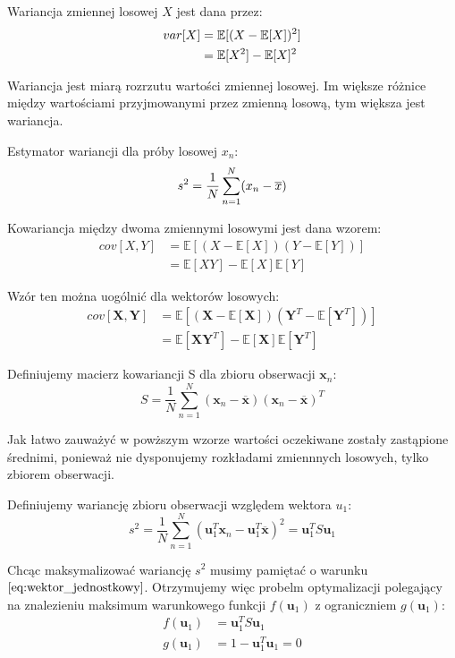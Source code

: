 \documentclass[oneside, eng]{mgr}
\newcommand{\bb}{\textbf}
\begin{document}
Wariancja zmiennej losowej $X$ jest dana przez:
\begin{align*}	\notag
	var[X]  &= \mathbb{E}[(X - \mathbb{E}[X])^2] \\
			&= \mathbb{E}[X^2] - \mathbb{E}[X]^2
\end{align*}

Wariancja jest miarą rozrzutu wartości zmiennej losowej. Im większe różnice między wartościami przyjmowanymi przez zmienną losową, tym większa jest wariancja.

Estymator wariancji dla próby losowej $x_n$:
\begin{equation}	\notag
	s^2 = \frac{1}{N} \sum_{n=1}^{N}(x_n - \overline{x})
\end{equation}

Kowariancja między dwoma zmiennymi losowymi jest dana wzorem:
\begin{align}	
	cov[X,Y] &= \mathbb{E}[(X - \mathbb{E}[X])(Y - \mathbb{E}[Y])]  \label{eq:cov} \\ 
			 &= \mathbb{E}[XY] - \mathbb{E}[X]\mathbb{E}[Y] \nonumber
\end{align}

Wzór ten można uogólnić dla wektorów losowych:
\begin{align*}
	cov[\textbf{X}, \bb{Y}] &= \mathbb{E}[(\bb{X} - \mathbb{E}[\bb{X}])(\bb{Y}^T - \mathbb{E}[\bb{Y}^T])] \\
							&= \mathbb{E}[\bb{X}\bb{Y}^T] - \mathbb{E}[\bb{X}]\mathbb{E}[\bb{Y}^T]
\end{align*}

Definiujemy macierz kowariancji S dla zbioru obserwacji $\bb{x}_n$:
\begin{equation}
	S = \frac{1}{N} \sum_{n=1}^{N} (\bb{x}_n - \overline{\bb{x}})(\bb{x}_n - \overline{\bb{x}})^T
\end{equation}

Jak łatwo zauważyć w powższym wzorze wartości oczekiwane zostały zastąpione średnimi, ponieważ nie dysponujemy rozkładami zmiennnych losowych, tylko zbiorem obserwacji.

Definiujemy wariancję zbioru obserwacji względem wektora $u_1$:
\begin{equation}
	s^2 = \frac{1}{N} \sum_{n=1}^{N}(\bb{u}_1^T \bb{x}_n - \bb{u}_1^T\overline{\bb{x}})^2 = \bb{u}_1^T S \bb{u}_1
\end{equation}

Chcąc maksymalizować wariancję $s^2$ musimy pamiętać o warunku $\ref{eq:wektor_jednostkowy}$. Otrzymujemy więc probelm optymalizacji polegający na znalezieniu maksimum warunkowego funkcji $f(\bb{u}_1)$ z ograniczniem $g(\bb{u}_1)$:
\begin{align*}
	f(\bb{u}_1) &= \bb{u}_1^T S \bb{u}_1 \\
	g(\bb{u}_1) &= 1 - \bb{u}_1^T \bb{u}_1 = 0
\end{align*}
\end{document}
